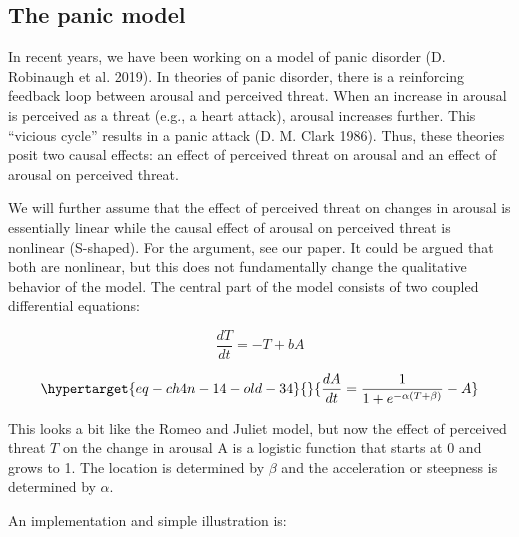\documentclass[
  a4paper,
  DIV=11,
  numbers=noendperiod,
  oneside]{scrreprt}
\begin{document}
\hypertarget{sec-The-panic-model}{%
\subsection{The panic model}\label{sec-The-panic-model}}

In recent years, we have been working on a model of panic disorder (D.
Robinaugh et al. 2019). In theories of panic disorder, there is a
reinforcing feedback loop between arousal and perceived threat. When an
increase in arousal is perceived as a threat (e.g., a heart attack),
arousal increases further. This ``vicious cycle'' results in a panic
attack (D. M. Clark 1986). Thus, these theories posit two causal
effects: an effect of perceived threat on arousal and an effect of
arousal on perceived threat.

We will further assume that the effect of perceived threat on changes in
arousal is essentially linear while the causal effect of arousal on
perceived threat is nonlinear (S-shaped). For the argument, see our
paper. It could be argued that both are nonlinear, but this does not
fundamentally change the qualitative behavior of the model. The central
part of the model consists of two coupled differential equations:

\[\frac{dT}{dt} = - T + bA\]

\begin{equation}\protect\hypertarget{eq-ch4n-14-old-34}{}{
\frac{dA}{dt} = \frac{1}{1 + e^{- \alpha(T + \beta)}} - A
}\label{eq-ch4n-14-old-34}\end{equation}

This looks a bit like the Romeo and Juliet model, but now the effect of
perceived threat \(T\) on the change in arousal A is a logistic function
that starts at 0 and grows to 1. The location is determined by \(\beta\)
and the acceleration or steepness is determined by \(\alpha\).

An implementation and simple illustration is:
\end{document}
